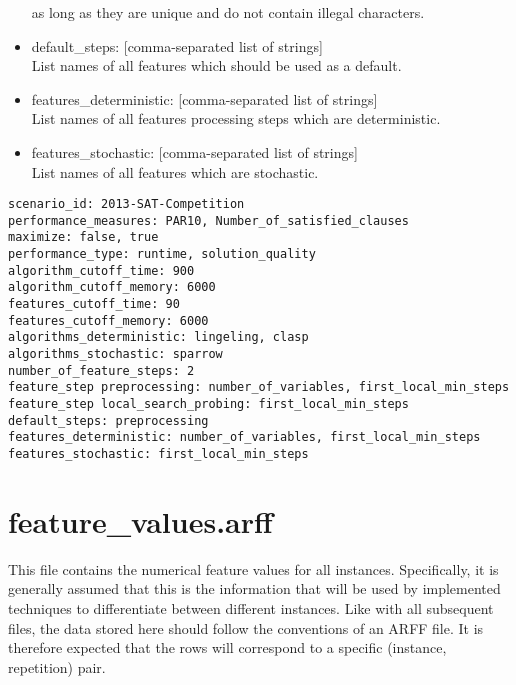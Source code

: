 \begin{itemize}
              	as long as they are unique and do not contain illegal characters.
    \item default\_steps: [comma-separated list of strings]\\
    	  List names of all features which should be used as a default.
    \item features\_deterministic: [comma-separated list of strings]\\
    	  List names of all features processing steps which are deterministic.
    \item features\_stochastic: [comma-separated list of strings]\\
          List names of all features which are stochastic. 
\end{itemize}

\begin{lstlisting}[caption=Example description.txt]
scenario_id: 2013-SAT-Competition
performance_measures: PAR10, Number_of_satisfied_clauses
maximize: false, true
performance_type: runtime, solution_quality
algorithm_cutoff_time: 900
algorithm_cutoff_memory: 6000
features_cutoff_time: 90
features_cutoff_memory: 6000
algorithms_deterministic: lingeling, clasp
algorithms_stochastic: sparrow
number_of_feature_steps: 2
feature_step preprocessing: number_of_variables, first_local_min_steps
feature_step local_search_probing: first_local_min_steps
default_steps: preprocessing
features_deterministic: number_of_variables, first_local_min_steps
features_stochastic: first_local_min_steps
\end{lstlisting}

\section{feature\_values.arff}

This file contains the numerical feature values for all instances. Specifically, it is generally assumed that this is the
information that will be used by implemented techniques to differentiate between different instances. Like with all
subsequent files, the data stored here should follow the conventions of an ARFF file. It is therefore expected that the
rows will correspond to a specific (instance, repetition) pair.


